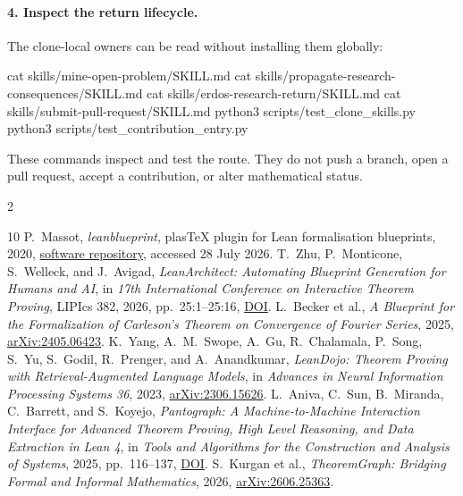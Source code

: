 \documentclass[11pt]{article}
\begin{document}
\paragraph{4. Inspect the return lifecycle.}
The clone-local owners can be read without installing them globally:
\begin{routeblock}
cat skills/mine-open-problem/SKILL.md
cat skills/propagate-research-consequences/SKILL.md
cat skills/erdos-research-return/SKILL.md
cat skills/submit-pull-request/SKILL.md
python3 scripts/test_clone_skills.py
python3 scripts/test_contribution_entry.py
\end{routeblock}
These commands inspect and test the route. They do not push a branch, open a
pull request, accept a contribution, or alter mathematical status.

\clearpage
{\scriptsize
\begin{multicols}{2}
\begin{thebibliography}{10}
\setlength{\itemsep}{0pt}
\setlength{\parsep}{0pt}
 P.~Massot, \emph{leanblueprint}, plasTeX plugin for
Lean formalisation blueprints, 2020,
\href{https://github.com/PatrickMassot/leanblueprint}{software repository},
accessed 28 July 2026.
 T.~Zhu, P.~Monticone, S.~Welleck, and J.~Avigad,
\emph{LeanArchitect: Automating Blueprint Generation for Humans and AI},
in \emph{17th International Conference on Interactive Theorem Proving},
LIPIcs 382, 2026, pp.~25:1--25:16,
\href{https://doi.org/10.4230/LIPIcs.ITP.2026.25}{DOI}.
 L.~Becker et al., \emph{A Blueprint for the Formalization
of Carleson's Theorem on Convergence of Fourier Series}, 2025,
\href{https://doi.org/10.48550/arXiv.2405.06423}{arXiv:2405.06423}.
 K.~Yang, A.~M.~Swope, A.~Gu, R.~Chalamala, P.~Song,
S.~Yu, S.~Godil, R.~Prenger, and A.~Anandkumar, \emph{LeanDojo: Theorem
Proving with Retrieval-Augmented Language Models}, in \emph{Advances in
Neural Information Processing Systems 36}, 2023,
\href{https://doi.org/10.48550/arXiv.2306.15626}{arXiv:2306.15626}.
 L.~Aniva, C.~Sun, B.~Miranda, C.~Barrett, and S.~Koyejo,
\emph{Pantograph: A Machine-to-Machine Interaction Interface for Advanced
Theorem Proving, High Level Reasoning, and Data Extraction in Lean 4}, in
\emph{Tools and Algorithms for the Construction and Analysis of Systems},
2025, pp.~116--137,
\href{https://doi.org/10.1007/978-3-031-90643-5_6}{DOI}.
 S.~Kurgan et al., \emph{TheoremGraph: Bridging Formal
and Informal Mathematics}, 2026,
\href{https://doi.org/10.48550/arXiv.2606.25363}{arXiv:2606.25363}.

\end{thebibliography}
\end{multicols}}
\end{document}
